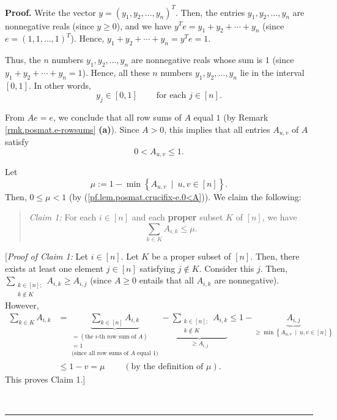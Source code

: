 \documentclass[numbers=enddot,12pt,final,onecolumn,notitlepage]{scrartcl}%
\numberwithin{exer}{subsection}
\theoremstyle{definition}
\newenvironment{statement}{\begin{quote}}{\end{quote}}
\newenvironment{proof}[1][Proof]{\noindent\textbf{#1.} }{\ \rule{0.5em}{0.5em}}
\let\sumnonlimits\sum
\renewcommand{\sum}{\sumnonlimits\limits}
\begin{document}
\begin{proof}
Write the vector $y=\left(  y_{1},y_{2},\ldots,y_{n}\right)  ^{T}$. Then, the
entries $y_{1},y_{2},\ldots,y_{n}$ are nonnegative reals (since $y\geq0$), and
we have $y^{T}e=y_{1}+y_{2}+\cdots+y_{n}$ (since $e=\left(  1,1,\ldots
,1\right)  ^{T}$). Hence, $y_{1}+y_{2}+\cdots+y_{n}=y^{T}e=1$.

Thus, the $n$ numbers $y_{1},y_{2},\ldots,y_{n}$ are nonnegative reals whose
sum is $1$ (since $y_{1}+y_{2}+\cdots+y_{n}=1$). Hence, all these $n$ numbers
$y_{1},y_{2},\ldots,y_{n}$ lie in the interval $\left[  0,1\right]  $. In
other words,%
\begin{equation}
y_{j}\in\left[  0,1\right]  \ \ \ \ \ \ \ \ \ \ \text{for each }j\in\left[
n\right]  . \label{pf.lem.posmat.crucifix-e.yj-in}%
\end{equation}


From $Ae=e$, we conclude that all row sums of $A$ equal $1$ (by Remark
\ref{rmk.posmat.e-rowsums} \textbf{(a)}). Since $A>0$, this implies that all
entries $A_{u,v}$ of $A$ satisfy%
\begin{equation}
0<A_{u,v}\leq1. \label{pf.lem.posmat.crucifix-e.0<A}%
\end{equation}


Let
\[
\mu:=1-\min\left\{  A_{u,v}\ \mid\ u,v\in\left[  n\right]  \right\}  .
\]
Then, $0\leq\mu<1$ (by (\ref{pf.lem.posmat.crucifix-e.0<A})). We claim the following:

\begin{statement}
\textit{Claim 1:} For each $i\in\left[  n\right]  $ and each \textbf{proper}
subset $K$ of $\left[  n\right]  $, we have%
\[
\sum_{k\in K}A_{i,k}\leq\mu.
\]

\end{statement}

[\textit{Proof of Claim 1:} Let $i\in\left[  n\right]  $. Let $K$ be a proper
subset of $\left[  n\right]  $. Then, there exists at least one element
$j\in\left[  n\right]  $ satisfying $j\notin K$. Consider this $j$. Then,
$\sum_{\substack{k\in\left[  n\right]  ;\\k\notin K}}A_{i,k}\geq A_{i,j}$
(since $A\geq0$ entails that all $A_{i,k}$ are nonnegative). However,%
\begin{align*}
\sum_{k\in K}A_{i,k}  &  =\underbrace{\sum_{k\in\left[  n\right]  }A_{i,k}%
}_{\substack{=\left(  \text{the }i\text{-th row sum of }A\right)
\\=1\\\text{(since all row sums of }A\text{ equal }1\text{)}}%
}-\underbrace{\sum_{\substack{k\in\left[  n\right]  ;\\k\notin K}}A_{i,k}%
}_{\geq A_{i,j}}\leq1-\underbrace{A_{i,j}}_{\geq\min\left\{  A_{u,v}%
\ \mid\ u,v\in\left[  n\right]  \right\}  }\\
&  \leq1-v=\mu\ \ \ \ \ \ \ \ \ \ \left(  \text{by the definition of }%
\mu\right)  .
\end{align*}
This proves Claim 1.] \medskip


\end{proof}
\end{document}
